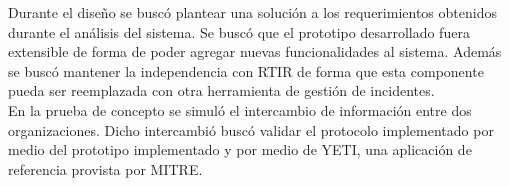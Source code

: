 Durante el diseño se buscó plantear una solución a los requerimientos obtenidos durante el análisis del sistema. Se buscó que el prototipo desarrollado fuera extensible de forma de poder agregar nuevas funcionalidades al sistema. Además se buscó mantener la independencia con RTIR de forma que esta componente pueda ser reemplazada con otra herramienta de gestión de incidentes. \\

En la prueba de concepto se simuló el intercambio de información entre dos organizaciones. Dicho intercambió buscó validar el protocolo implementado por medio del prototipo implementado y por medio de YETI, una aplicación de referencia provista por MITRE.

